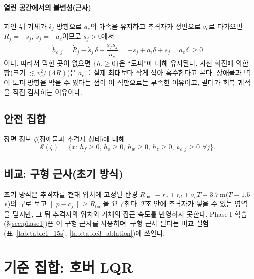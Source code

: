 \documentclass[10pt,a4paper]{article}
\newcommand{\Safe}{\mathcal{S}}
\begin{document}
\paragraph{열린 공간에서의 불변성(근사)} 지연 뒤 기체가 $\hat e_j$ 방향으로 $a_e$의 가속을 유지하고 추격자가 정면으로 $v_c$로 다가오면 $\dot R_j=-s_j$, $\dot s_j=-a_e$이므로 $s_j>0$에서
\begin{equation}
\dot h_{c,j}=\dot R_j-\dot s_j\,\delta-\frac{s_j\dot s_j}{a_e}=-s_j+a_e\delta+s_j=a_e\delta\ \ge0
\end{equation}
이다. 따라서 막힌 곳이 없으면 $\{h_c\ge0\}$은 ``도피''에 대해 유지된다. 시선 회전에 의한 항(크기 $\lesssim v_c^2/(4R)$)은 $a_e$를 실제 최대보다 작게 잡아 흡수한다고 본다.
장애물과 벽이 도피 방향을 막을 수 있다는 점이 이 식만으로는 부족한 이유이고, 필터가 회복 궤적을 직접 검사하는 이유이다.

\subsection{안전 집합}
장면 정보 $\zeta$(장애물과 추격자 상태)에 대해
\begin{equation}
\Safe(\zeta)=\big\{x:\ h_f\ge0,\ h_o\ge0,\ h_w\ge0,\ h_z\ge0,\ h_{c,j}\ge0\ \ \forall j\big\}.
\label{eq:safe}
\end{equation}

\subsection{비교: 구형 근사(초기 방식)}\label{sec:ball}
초기 방식은 추격자를 현재 위치에 고정된 반경 $R_{\mathrm{ball}}=r_c+r_d+v_cT=3.7$\,m($T=1.5$\,s)의 구로 보고 $\|p-c_j\|\ge R_{\mathrm{ball}}$을 요구한다.
$T$초 안에 추격자가 닿을 수 있는 영역을 덮지만, 그 뒤 추격자의 위치와 기체의 접근 속도를 반영하지 못한다.
Phase I 학습(\S\ref{sec:phase1})은 이 구형 근사를 사용하며, 구형 근사 필터는 비교 실험(표~\ref{tab:table1_15s}, \ref{tab:table3_ablation})에 쓰인다.

\section{기준 집합: 호버 LQR}\label{sec:base}
\end{document}
